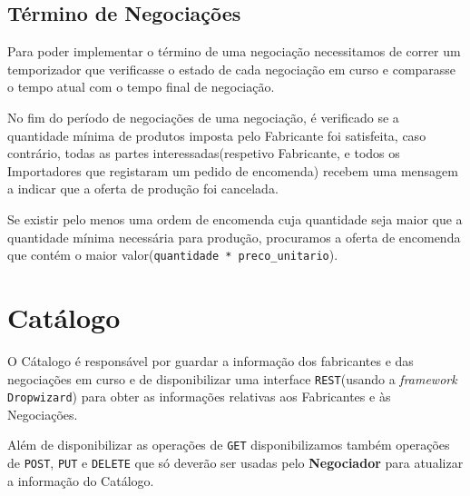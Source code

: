 \documentclass[12pt, a4paper]{report}
\begin{document}
\section{Término de Negociações}

Para poder implementar o término de uma negociação necessitamos de correr um temporizador que verificasse o estado de cada negociação em curso e comparasse o tempo atual com o tempo final de negociação.


No fim do período de negociações de uma negociação, é verificado se a quantidade mínima de produtos imposta pelo Fabricante foi satisfeita, caso contrário, todas as partes interessadas(respetivo Fabricante, e todos os Importadores que registaram um pedido de encomenda) recebem uma mensagem a indicar que a oferta de produção foi cancelada.


Se existir pelo menos uma ordem de encomenda cuja quantidade seja maior que a quantidade mínima necessária para produção, procuramos a oferta de encomenda que contém o maior valor(\texttt{quantidade * preco\_unitario}).

\chapter{Catálogo}

O Cátalogo é responsável por guardar a informação dos fabricantes e das negociações em curso e de disponibilizar uma interface \texttt{REST}(usando a \textit{framework} \texttt{Dropwizard}) para obter as informações relativas aos Fabricantes e às Negociações.


Além de disponibilizar as operações de \texttt{GET} disponibilizamos também operações de \texttt{POST}, \texttt{PUT} e \texttt{DELETE} que só deverão ser usadas pelo \textbf{Negociador} para atualizar a informação do Catálogo.
\end{document}
